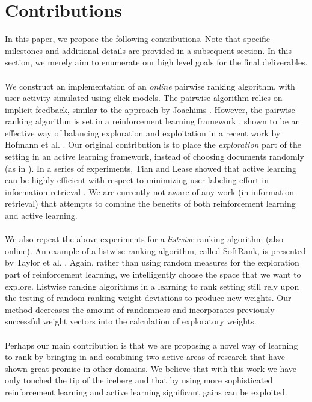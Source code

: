 \documentclass{acm_proc_article-sp}
\begin{document}
\section{Contributions}
In this paper, we propose the following contributions. Note that specific milestones and additional details are provided in a subsequent section. In this section, we merely aim to enumerate our high level goals for the final deliverables.\\ \\
We construct an implementation of an \emph{online} pairwise ranking algorithm, with user activity simulated using click models. The pairwise algorithm relies on implicit feedback, similar to the approach by Joachims \cite{joachims}. However, the pairwise ranking algorithm is set in a reinforcement learning framework \cite{rl}, shown to be an effective way of balancing exploration and exploitation in a recent work by Hofmann et al. \cite{hofmann}. Our original contribution is to place the \emph{exploration} part of the setting in an active learning framework, instead of choosing documents randomly (as in \cite{hofmann}). In a series of experiments, Tian and Lease showed that active learning can be highly efficient with respect to minimizing user labeling effort in information retrieval \cite{aibo}. We are currently not aware of any work (in information retrieval) that attempts to combine the benefits of both reinforcement learning and active learning. \\ \\
We also repeat the above experiments for a \emph{listwise} ranking algorithm (also online). An example of a listwise ranking algorithm, called SoftRank, is presented by Taylor et al. \cite{taylor}. Again, rather than using random measures for the exploration part of reinforcement learning, we intelligently choose the space that we want to explore.  Listwise ranking algorithms in a learning to rank setting still rely upon the testing of random ranking weight deviations to produce new weights.  Our method decreases the amount of randomness and incorporates previously successful weight vectors into the calculation of exploratory weights.\\ \\
Perhaps our main contribution is that we are proposing a novel way of learning to rank by bringing in and combining two active areas of research that have shown great promise in other domains. We believe that with this work we have only touched the tip of the iceberg and that by using more sophisticated reinforcement learning and active learning significant gains can be exploited. 
\end{document}
